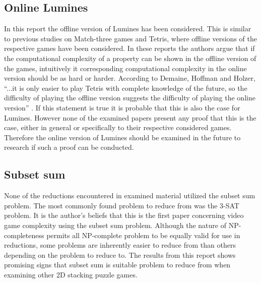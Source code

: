 \subsection{Online Lumines}

In this report the offline version of Lumines has been considered. This is similar to previous studies on Match-three games and Tetris, where offline versions of the respective games have been considered. In these reports the authors argue that if the computational complexity of a property can be shown in the offline version of the games, intuitively it corresponding computational complexity in the online version should be as hard or harder. According to Demaine, Hoffman and Holzer, ``...it is only easier to play Tetris with complete knowledge of the future, so the difficulty of playing the offline version suggests the difficulty of playing the online version'' \cite[p. 2]{tetris}. If this statement is true it is probable that this is also the case for Lumines. However none of the examined papers present any proof that this is the case, either in general or specifically to their respective considered games. Therefore the online version of Lumines should be examined in the future to research if such a proof can be conducted.

\subsection{Subset sum}

None of the reductions encountered in examined material utilized the subset sum problem. The most commonly found problem to reduce from was the 3-SAT problem. It is the author's beliefs that this is the first paper concerning video game complexity using the subset sum problem. Although the nature of NP-completeness permits all NP-complete problem to be equally valid for use in reductions, some problems are inherently easier to reduce from than others depending on the problem to reduce to. The results from this report shows promising signs that subset sum is suitable problem to reduce from when examining other 2D stacking puzzle games. 
